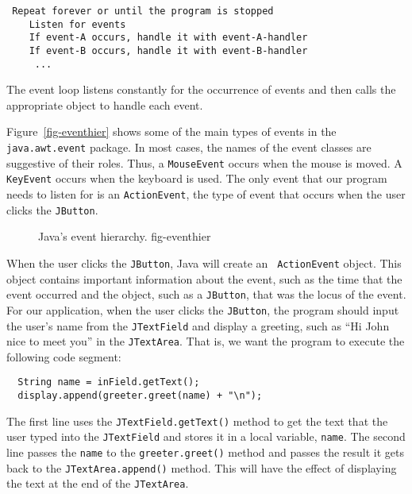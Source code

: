 \begin{jjjlisting}
\begin{lstlisting}
 Repeat forever or until the program is stopped
    Listen for events
    If event-A occurs, handle it with event-A-handler
    If event-B occurs, handle it with event-B-handler
     ...
\end{lstlisting}
\end{jjjlisting}

\noindent The event loop listens constantly for the occurrence
of events and then calls the appropriate object to handle each event.

Figure~\ref{fig-eventhier} shows some of the main types of events in
the {\tt java.awt.event} package.  In most cases, the names of the
event classes are suggestive of their roles.  Thus, a {\tt MouseEvent}
occurs when the mouse is moved. A {\tt KeyEvent} occurs when the
keyboard is used. The only event that our program needs to listen for
is an {\tt ActionEvent}, the type of event that occurs when the user
clicks  the {\tt JButton}.

\begin{figure}[tb]
{Java's event hierarchy.
} {fig-eventhier}

\end{figure}

When the user clicks the {\tt JButton}, Java will create an {\tt
ActionEvent} object.  This object contains important information about
the event, such as the time that the event occurred and the object,
such as a {\tt JButton}, that was the locus of the event.  For our
application, when the user clicks the {\tt JButton}, the program
should input the user's name from the {\tt JTextField} and display a
greeting, such as ``Hi John nice to meet you'' in the {\tt JTextArea}.
That is, we want the program to execute the following code segment:

\begin{jjjlisting}
\begin{lstlisting}
  String name = inField.getText();
  display.append(greeter.greet(name) + "\n");
\end{lstlisting}
\end{jjjlisting}

\noindent The first line uses the {\tt JTextField.getText()} method
to get the text that the user typed into the {\tt JTextField} and
stores it in a local variable, {\tt name}. The second line passes the
{\tt name} to the {\tt greeter.greet()} method and passes the result it
gets back to the {\tt JTextArea.append()} method. This will have the
effect of displaying the text at the end of the {\tt JTextArea}. 

